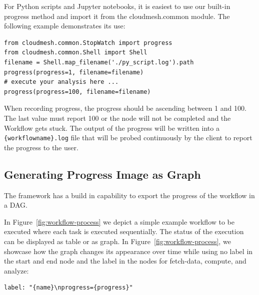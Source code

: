 For Python scripts and Jupyter notebooks, it is easiest
to use our built-in progress method and import it from the
cloudmesh.common module. The following example demonstrates its use:

\smallskip
\begin{verbatim}
from cloudmesh.common.StopWatch import progress
from cloudmesh.common.Shell import Shell
filename = Shell.map_filename('./py_script.log').path
progress(progress=1, filename=filename)
# execute your analysis here ...
progress(progress=100, filename=filename)
\end{verbatim}
\smallskip

When recording progress, the progress should be ascending between 1
and 100. The last value must report 100 or the node will not be
completed and the Workflow gets stuck. The output of the progress
will be written into a \verb|{workflowname}.log| file that will be
probed continuously by the client to report the progress to the user.

\subsection{Generating Progress Image as Graph}

The framework has a build in capability to export the progress of the
workflow in a DAG.

In Figure~\ref{fig:workflow-process} we depict a simple example
workflow to be executed where each task is executed sequentially. The
status of the execution can be displayed as table or as graph. In
Figure~\ref{fig:workflow-process}, we showcase how the graph changes
its appearance over time while using no label in the start and end
node and the label in the nodes for fetch-data, compute, and analyze:

\begin{verbatim}
label: "{name}\nprogress={progress}"
\end{verbatim}

